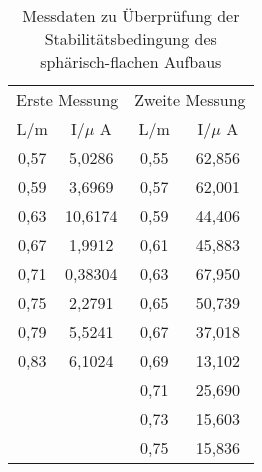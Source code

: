 \begin{table}[h!]
  \centering
  \caption{Messdaten zu Überprüfung der Stabilitätsbedingung des sphärisch-flachen Aufbaus}
  \label{tab:stabflat}
  \begin{tabular}{c c c c}
    \toprule
    \multicolumn{2}{c}{Erste Messung} & \multicolumn{2}{c}{Zweite Messung}\\
      L/m & I/$\mu$ A & L/m & I/$\mu$ A \\
      \midrule
      0,57 &  5,0286  & 0,55 & 62,856 \\
      0,59 &  3,6969  & 0,57 & 62,001 \\
      0,63 & 10,6174  & 0,59 & 44,406 \\
      0,67 &  1,9912  & 0,61 & 45,883 \\
      0,71 &  0,38304 & 0,63 & 67,950 \\
      0,75 &  2,2791  & 0,65 & 50,739 \\
      0,79 &  5,5241  & 0,67 & 37,018 \\
      0,83 &  6,1024  & 0,69 & 13,102 \\
           &          & 0,71 & 25,690 \\
           &          & 0,73 & 15,603 \\
           &          & 0,75 & 15,836 \\
    \bottomrule
  \end{tabular}
\end{table}

%
